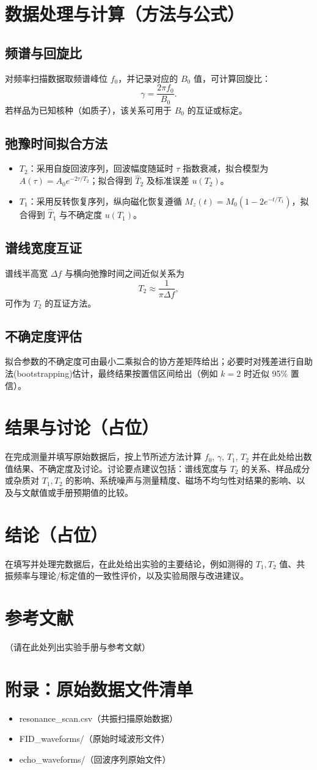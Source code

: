 \documentclass[12pt,a4paper]{article}
\begin{document}
\section{数据处理与计算（方法与公式）}
\subsection{频谱与回旋比}
对频率扫描数据取频谱峰位 $f_0$，并记录对应的 $B_0$ 值，可计算回旋比：
$$\gamma=\frac{2\pi f_0}{B_0}.$$ 
若样品为已知核种（如质子），该关系可用于 $B_0$ 的互证或标定。

\subsection{弛豫时间拟合方法}
\begin{itemize}
    \item $T_2$：采用自旋回波序列，回波幅度随延时 $\tau$ 指数衰减，拟合模型为 $A(\tau)=A_0e^{-2\tau/T_2}$；拟合得到 $\hat{T}_2$ 及标准误差 $u(T_2)$。
    \item $T_1$：采用反转恢复序列，纵向磁化恢复遵循 $M_z(t)=M_0(1-2e^{-t/T_1})$，拟合得到 $\hat{T}_1$ 与不确定度 $u(T_1)$。
\end{itemize}

\subsection{谱线宽度互证}
谱线半高宽 $\Delta f$ 与横向弛豫时间之间近似关系为
$$T_2\approx\frac{1}{\pi\Delta f},$$
可作为 $T_2$ 的互证方法。

\subsection{不确定度评估}
拟合参数的不确定度可由最小二乘拟合的协方差矩阵给出；必要时对残差进行自助法(bootstrapping)估计，最终结果按置信区间给出（例如 $k=2$ 时近似 95\% 置信）。

\section{结果与讨论（占位）}
在完成测量并填写原始数据后，按上节所述方法计算 $f_0$, $\gamma$, $T_1$, $T_2$ 并在此处给出数值结果、不确定度及讨论。讨论要点建议包括：谱线宽度与 $T_2$ 的关系、样品成分或杂质对 $T_1,T_2$ 的影响、系统噪声与测量精度、磁场不均匀性对结果的影响、以及与文献值或手册预期值的比较。

\section{结论（占位）}
在填写并处理完数据后，在此处给出实验的主要结论，例如测得的 $T_1,T_2$ 值、共振频率与理论/标定值的一致性评价，以及实验局限与改进建议。

\section{参考文献}
（请在此处列出实验手册与参考文献）

\section*{附录：原始数据文件清单}
\begin{itemize}
    \item resonance_scan.csv（共振扫描原始数据）
    \item FID_waveforms/（原始时域波形文件）
    \item echo_waveforms/（回波序列原始文件）
\end{itemize}
\end{document}
